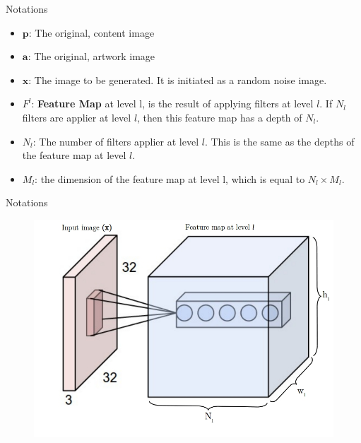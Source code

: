 \documentclass{beamer}
\begin{document}
\begin{frame}{Notations}
    \begin{itemize}
        \item $\mathbf{p}$: The original, content image
        \item $\mathbf{a}$: The original, artwork image
        \item $\mathbf{x}$: The image to be generated. It is initiated as a
            random noise image.
        \item $F^l$: \textbf{Feature Map} at level l, is the result of applying
            filters at level $l$. If $N_l$ filters are applier at level $l$,
            then this feature map has a depth of $N_l$.
        \item $N_l$: The number of filters applier at level $l$. This is
            the same as the depths of the feature map at level
            $l$.
        \item $M_l$: the dimension of the feature map at level l, which
            is equal to $N_l \times M_l$.
    \end{itemize}
\end{frame}



\begin{frame}{Notations}
    \begin{figure}[H]
        \centering
        \includegraphics[width=.8\textwidth]{img/levels}
    \end{figure}
\end{frame}
\end{document}

